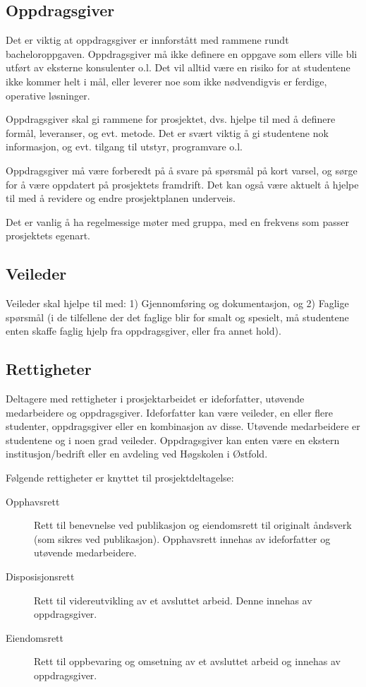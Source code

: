 \documentclass[11pt,a4paper]{report}
\begin{document}
\subsection*{Oppdragsgiver}

Det er viktig at oppdragsgiver er innforstått med rammene rundt bacheloroppgaven. Oppdragsgiver må ikke definere en oppgave som ellers ville bli utført av eksterne konsulenter o.l. Det vil alltid være en risiko for at studentene ikke kommer helt i mål, eller leverer noe som ikke nødvendigvis er ferdige, operative løsninger.

Oppdragsgiver skal gi rammene for prosjektet, dvs. hjelpe til med å definere formål, leveranser, og evt. metode. Det er svært viktig å gi studentene nok informasjon, og evt. tilgang til utstyr, programvare o.l.

Oppdragsgiver må være forberedt på å svare på spørsmål på kort varsel, og sørge for å være oppdatert på prosjektets framdrift. Det kan også være aktuelt å hjelpe til med å revidere og endre prosjektplanen underveis.

Det er vanlig å ha regelmessige møter med gruppa, med en frekvens som passer prosjektets egenart. 

\subsection*{Veileder}

Veileder skal hjelpe til med: 1) Gjennomføring og dokumentasjon, og 2) Faglige spørsmål (i de tilfellene der det faglige blir for smalt og spesielt, må studentene enten skaffe faglig hjelp fra oppdragsgiver, eller fra annet hold). 

\subsection*{Rettigheter}

Deltagere med rettigheter i prosjektarbeidet er ideforfatter, utøvende medarbeidere og oppdragsgiver.
Ideforfatter kan være veileder, en eller flere studenter, oppdragsgiver eller en kombinasjon av disse. 
Utøvende medarbeidere er studentene og i noen grad veileder. 
Oppdragsgiver kan enten være en ekstern institusjon/bedrift eller en avdeling ved Høgskolen i Østfold. 

Følgende rettigheter er knyttet til prosjektdeltagelse:


\begin{description}
	\item[Opphavsrett] 
    Rett til benevnelse ved publikasjon og eiendomsrett til originalt åndsverk (som sikres ved publikasjon). Opphavsrett innehas av ideforfatter og utøvende medarbeidere. 
	\item[Disposisjonsrett]
    Rett til videreutvikling av et avsluttet arbeid. Denne innehas av oppdragsgiver. 
	\item[Eiendomsrett]
    Rett til oppbevaring og omsetning av et avsluttet arbeid og innehas av oppdragsgiver. 
\end{description}
\end{document}
